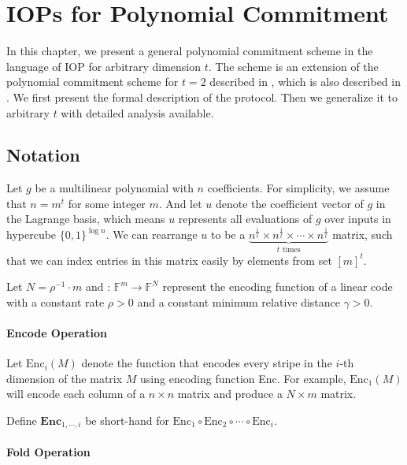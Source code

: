 \chapter{IOPs for Polynomial Commitment}

In this chapter, we present a general polynomial commitment scheme in the language of IOP for arbitrary dimension $t$. The scheme is an extension of the polynomial commitment scheme for $t=2$ described in \cite{brakedown}, which is also described in \cite{cryptoeprint:2020/1426}. We first present the formal description of the protocol. Then we generalize it to arbitrary $t$ with detailed analysis available.

\section{Notation}

Let $g$ be a multilinear polynomial with $n$ coefficients. For simplicity, we assume that $n = m^t$ for some integer $m$. And let $u$ denote the coefficient vector of $g$ in the Lagrange basis, which means $u$ represents all evaluations of $g$ over inputs in hypercube $\{0, 1\}^{\log n}$. 
We can rearrange $u$ to be a $\underbrace{n^{\frac{1}{t}} \times n^{\frac{1}{t}} \times \cdots \times n^{\frac{1}{t}}}_{t \text{ times}}$ matrix, such that we can index entries in this matrix easily by elements from set $[m]^t$.

Let $N = \rho^{-1} \cdot m$ and : $\mathbb{F}^m \rightarrow \mathbb{F}^N$ represent the encoding function of a linear code with a constant rate $\rho > 0$ and a constant minimum relative distance $\gamma > 0$.

\subsubsection{Encode Operation}

Let $\text{Enc}_i(M)$ denote the function that encodes every stripe in the $i$-th dimension of the matrix $M$ using encoding function Enc. For example, $\text{Enc}_1(M)$ will encode each column of a $n \times n $ matrix and produce a $N \times m$ matrix.


Define $\textbf{Enc}_{1,\cdots,i}$ be short-hand for $\text{Enc}_1 \circ \text{Enc}_2 \circ \cdots \circ \text{Enc}_{i}$.

\subsubsection{Fold Operation}

